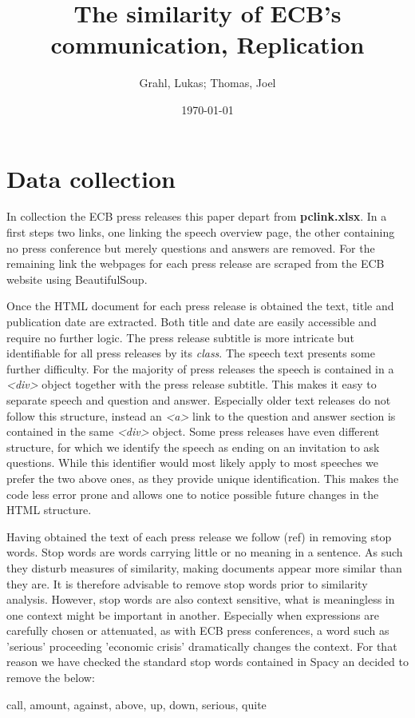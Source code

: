 \documentclass[12pt,a4paper,english]{article}
\author{Grahl, Lukas; Thomas, Joel}
\title{The similarity of ECB’s communication, Replication}
\date{\today}
\begin{document}
	\maketitle
	
	\section{Data collection}
	
	In collection the ECB press releases this paper depart from \textbf{pc\textunderscore link.xlsx}. In a first steps two links, one linking the speech overview page, the other containing no press conference but merely questions and answers are removed. For the remaining link the webpages for each press release are scraped from the ECB website using BeautifulSoup. 
	
	Once the HTML document for each press release is obtained the text, title and publication date are extracted. Both title and date are easily accessible and require no further logic. The press release subtitle is more intricate but identifiable for all press releases by its \textit{class}. The speech text presents some further difficulty. For the majority of press releases the speech is contained in a \textit{<div>} object together with the press release subtitle. This makes it easy to separate speech and question and answer. Especially older text releases do not follow this structure, instead an \textit{<a>} link to the question and answer section is contained in the same \textit{<div>} object. Some press releases have even different structure, for which we identify the speech as ending on an invitation to ask questions. While this identifier would most likely apply to most speeches we prefer the two above ones, as they provide unique identification. This makes the code less error prone and allows one to notice possible future changes in the HTML structure. 
	
	Having obtained the text of each press release we follow (ref) in removing stop words. Stop words are words carrying little or no meaning in a sentence. As such they disturb measures of similarity, making documents appear more similar than they are. It is therefore advisable to remove stop words prior to similarity analysis. However, stop words are also context sensitive, what is meaningless in one context might be important in another. Especially when expressions are carefully chosen or attenuated, as with ECB press conferences, a word such as 'serious' proceeding 'economic crisis' dramatically changes the context.
	For that reason we have checked the standard stop words contained in Spacy an decided to remove the below:
	\begin{center}
		call, amount, against, above, up, down, serious, quite
	\end{center}
\end{document}
